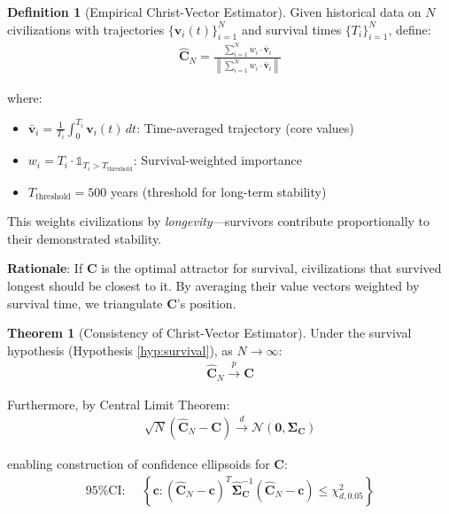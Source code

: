 \documentclass[11pt,a4paper]{article}
\theoremstyle{definition}
\newtheorem{definition}{Definition}[section]
\newtheorem{theorem}{Theorem}[section]
\theoremstyle{remark}
\begin{document}
\begin{definition}[Empirical Christ-Vector Estimator]
Given historical data on \(N\) civilizations with trajectories \(\{\mathbf{v}_i(t)\}_{i=1}^N\) and survival times \(\{T_i\}_{i=1}^N\), define:
\begin{align}
\hat{\mathbf{C}}_N = \frac{\sum_{i=1}^N w_i \cdot \bar{\mathbf{v}}_i}{\left\|\sum_{i=1}^N w_i \cdot \bar{\mathbf{v}}_i\right\|}
\end{align}

where:
\begin{itemize}
\item \(\bar{\mathbf{v}}_i = \frac{1}{T_i} \int_0^{T_i} \mathbf{v}_i(t) \, dt\): Time-averaged trajectory (core values)
\item \(w_i = T_i \cdot \mathbb{1}_{T_i > T_{\text{threshold}}}\): Survival-weighted importance
\item \(T_{\text{threshold}} = 500\) years (threshold for long-term stability)
\end{itemize}

This weights civilizations by \textit{longevity}—survivors contribute proportionally to their demonstrated stability.

\textbf{Rationale}: If \(\mathbf{C}\) is the optimal attractor for survival, civilizations that survived longest should be closest to it. By averaging their value vectors weighted by survival time, we triangulate \(\mathbf{C}\)'s position.
\end{definition}

\begin{theorem}[Consistency of Christ-Vector Estimator]
Under the survival hypothesis (Hypothesis \ref{hyp:survival}), as \(N \to \infty\):
\begin{align}
\hat{\mathbf{C}}_N \xrightarrow{p} \mathbf{C}
\end{align}

Furthermore, by Central Limit Theorem:
\begin{align}
\sqrt{N}(\hat{\mathbf{C}}_N - \mathbf{C}) \xrightarrow{d} \mathcal{N}(\mathbf{0}, \boldsymbol{\Sigma}_{\mathbf{C}})
\end{align}

enabling construction of confidence ellipsoids for \(\mathbf{C}\):
\begin{align}
\text{95\% CI: } \quad \left\{\mathbf{c} : (\hat{\mathbf{C}}_N - \mathbf{c})^T \hat{\boldsymbol{\Sigma}}_{\mathbf{C}}^{-1} (\hat{\mathbf{C}}_N - \mathbf{c}) \leq \chi^2_{d, 0.05}\right\}
\end{align}
\end{theorem}
\end{document}
